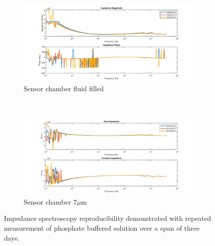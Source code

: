 \begin{figure}[h]
    \centering
    \begin{subfigure}[b]{\textwidth}
        \centering
        \includegraphics[width=\textwidth]{images/reproducibility_PBS_mag_phase.png}
        \caption{Sensor chamber fluid filled}
    \end{subfigure}
    \\
    \vspace{0.1 in}
    \begin{subfigure}[b]{\textwidth}
        \centering
        \includegraphics[width=\textwidth]{images/reproducibility_PBS_real_imag.png}
        \caption{Sensor chamber 7$\mu$m }
    \end{subfigure}
    \caption{Impedance spectroscopy reproducibility demonstrated with repeated measurement of phosphate buffered solution over a span of three days.}
    \label{fig:IS_data_reproducibility}
\end{figure}


